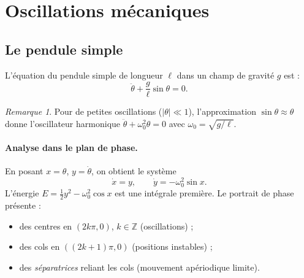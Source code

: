 \documentclass[12pt,a4paper,openany]{book}
\theoremstyle{definition}
\theoremstyle{plain}
\theoremstyle{remark}
\newtheorem{remarque}[definition]{Remarque}
\newcommand{\Z}{\mathbb{Z}}
\newcommand{\abs}[1]{\left|#1\right|}
\begin{document}
\section{Oscillations mécaniques}
\label{sec:oscillations}

\subsection{Le pendule simple}
\label{subsec:pendule-simple}

L'équation du pendule simple de longueur $\ell$ dans un champ de
gravité $g$ est :
\begin{equation}
\label{eq:pendule-simple}
\ddot{\theta} + \frac{g}{\ell}\sin\theta = 0.
\end{equation}

\begin{remarque}
Pour de petites oscillations ($\abs{\theta} \ll 1$), l'approximation
$\sin\theta \approx \theta$ donne l'oscillateur harmonique
$\ddot{\theta} + \omega_0^2 \theta = 0$ avec
$\omega_0 = \sqrt{g/\ell}$.
\end{remarque}

\paragraph{Analyse dans le plan de phase.}
En posant $x = \theta$, $y = \dot{\theta}$, on obtient le système
\[
\dot{x} = y, \qquad \dot{y} = -\omega_0^2 \sin x.
\]
L'énergie $E = \frac{1}{2}y^2 - \omega_0^2 \cos x$ est une intégrale
première. Le portrait de phase présente :
\begin{itemize}
  \item des centres en $(2k\pi, 0)$, $k \in \Z$ (oscillations) ;
  \item des cols en $((2k+1)\pi, 0)$ (positions instables) ;
  \item des \emph{séparatrices} reliant les cols
        (mouvement apériodique limite).
\end{itemize}

\begin{center}
\end{center}
\end{document}
